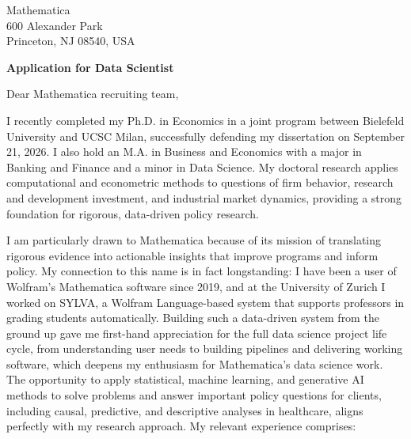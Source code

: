 \documentclass[11pt]{article}
\begin{document}
\vspace{0.1cm}

\noindent
Mathematica \\
600 Alexander Park \\
Princeton, NJ 08540, USA

\vspace{0.12cm}

\noindent
\textbf{Application for Data Scientist}

\vspace{0.1cm}

\noindent Dear Mathematica recruiting team,

I recently completed my Ph.D. in Economics in a joint program between Bielefeld University and UCSC Milan,
successfully defending my dissertation on September 21, 2026.
I also hold an M.A. in Business and Economics with a major in Banking and Finance and a minor in Data Science.
My doctoral research applies computational and econometric methods to questions of firm behavior, 
research and development investment, and industrial market dynamics,
providing a strong foundation for rigorous, data-driven policy research.

I am particularly drawn to Mathematica because of its mission of translating rigorous evidence into actionable insights that improve programs and inform policy.
My connection to this name is in fact longstanding: 
I have been a user of Wolfram's Mathematica software since 2019,
and at the University of Zurich I worked on SYLVA, a Wolfram Language-based system that supports professors in grading students automatically.
Building such a data-driven system from the ground up gave me first-hand appreciation for the full data science project life cycle,
from understanding user needs to building pipelines and delivering working software,
which deepens my enthusiasm for Mathematica's data science work.
The opportunity to apply statistical, machine learning, and generative AI methods to solve problems and answer important policy questions for clients,
including causal, predictive, and descriptive analyses in healthcare,
aligns perfectly with my research approach.
My relevant experience comprises:
\end{document}
